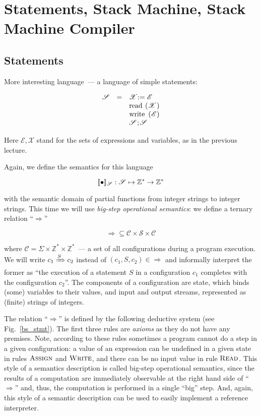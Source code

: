 \section{Statements, Stack Machine, Stack Machine Compiler}

\subsection{Statements}

More interesting language~--- a language of simple statements:

$$
\begin{array}{rcl}  
  \mathscr S & = & \mathscr X \mbox{\lstinline|:=|} \;\mathscr E \\
             &   & \mbox{\lstinline|read (|} \mathscr X \mbox{\lstinline|)|} \\
             &   & \mbox{\lstinline|write (|} \mathscr E \mbox{\lstinline|)|} \\
             &   & \mathscr S \mbox{\lstinline|;|} \mathscr S
\end{array}
$$

Here $\mathscr E, \mathscr X$ stand for the sets of expressions and variables, as in the previous lecture.

Again, we define the semantics for this language 

$$
\llbracket{\bullet}\rrbracket_{\mathscr S} : \mathscr S \mapsto \mathbb Z^* \to \mathbb Z^*
$$

with the semantic domain of partial functions from integer strings to integer strings. This time we will
use \emph{big-step operational semantics}: we define a ternary relation ``$\Rightarrow$''

$$
\Rightarrow \subseteq \mathscr C \times \mathscr S \times \mathscr C
$$

where $\mathscr C = \Sigma \times \mathbb Z^* \times \mathbb Z^*$~--- a set of all configurations during a
program execution. We will write $c_1\xRightarrow{S}c_2$ instead of $(c_1, S, c_2)\in\Rightarrow$ and informally
interpret the former as ``the execution of a statement $S$ in a configuration $c_1$ completes with the configuration
$c_2$''. The components of a configuration are state, which binds (some) variables to their values, and input and
output streams, represented as (finite) strings of integers.

The relation ``$\Rightarrow$'' is defined by the following deductive system (see Fig.~\ref{bs_stmt}). The first
three rules are \emph{axioms} as they do not have any premises. Note, according to these rules sometimes a program
cannot do a step in a given configuration: a value of an expression can be undefined in a given state in rules
$\textsc{Assign}$ and $\textsc{Write}$, and there can be no input value in rule $\textsc{Read}$. This style of
a semantics description is called big-step operational semantics, since the results of a computation are
immediately observable at the right hand side of ``$\Rightarrow$'' and, thus, the computation is performed in
a single ``big'' step. And, again, this style of a semantic description can be used to easily implement a
reference interpreter.

